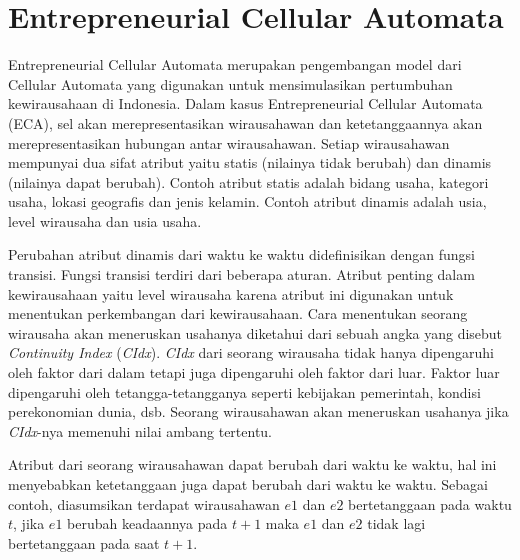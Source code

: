 \section{Entrepreneurial Cellular Automata}
\label{sec:ECA}
Entrepreneurial Cellular Automata merupakan pengembangan model dari Cellular Automata yang digunakan untuk mensimulasikan pertumbuhan kewirausahaan di Indonesia. Dalam kasus Entrepreneurial Cellular Automata (ECA), sel akan merepresentasikan wirausahawan dan ketetanggaannya akan merepresentasikan hubungan antar wirausahawan. Setiap wirausahawan mempunyai dua sifat atribut yaitu statis (nilainya tidak berubah) dan dinamis (nilainya dapat berubah). Contoh atribut statis adalah bidang usaha, kategori usaha, lokasi geografis dan jenis kelamin. Contoh atribut dinamis adalah usia, level wirausaha dan usia usaha.  

Perubahan atribut dinamis dari waktu ke waktu didefinisikan dengan fungsi transisi. Fungsi transisi terdiri dari beberapa aturan. Atribut penting dalam kewirausahaan yaitu level wirausaha karena atribut ini digunakan untuk menentukan perkembangan dari kewirausahaan. Cara menentukan seorang wirausaha akan meneruskan usahanya diketahui dari sebuah angka yang disebut \textit{Continuity Index} (\textit{CIdx}). \textit{CIdx} dari seorang wirausaha tidak hanya dipengaruhi oleh faktor dari dalam tetapi juga dipengaruhi oleh faktor dari luar. Faktor luar dipengaruhi oleh tetangga-tetangganya seperti kebijakan pemerintah, kondisi perekonomian dunia, dsb. Seorang wirausahawan akan meneruskan usahanya jika \textit{CIdx}-nya memenuhi nilai ambang tertentu.

Atribut dari seorang wirausahawan dapat berubah dari waktu ke waktu, hal ini menyebabkan ketetanggaan juga dapat berubah dari waktu ke waktu. Sebagai contoh, diasumsikan terdapat wirausahawan $e1$ dan $e2$ bertetanggaan pada waktu $t$, jika $e1$ berubah keadaannya pada $t+1$ maka $e1$ dan $e2$ tidak lagi bertetanggaan pada saat $t+1$.

